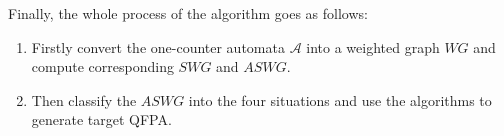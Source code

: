\documentclass[12pt]{article}
\begin{document}
Finally, the whole process of the algorithm goes as follows:
\begin{enumerate}



\item Firstly convert the one-counter automata $\mathcal{A}$ into a weighted graph $WG$ and compute corresponding $SWG$ and $ASWG$. 

\item Then classify the $ASWG$ into the four situations and use the algorithms to generate target QFPA.
\end{enumerate}

\clearpage


\end{document}
